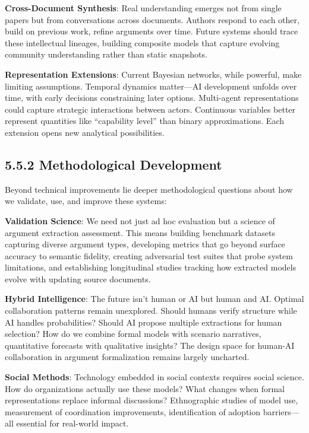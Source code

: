 \documentclass[
  11pt,
  letterpaper,
]{book}
\begin{document}
\textbf{Cross-Document Synthesis}: Real understanding emerges not from
single papers but from conversations across documents. Authors respond
to each other, build on previous work, refine arguments over time.
Future systems should trace these intellectual lineages, building
composite models that capture evolving community understanding rather
than static snapshots.

\textbf{Representation Extensions}: Current Bayesian networks, while
powerful, make limiting assumptions. Temporal dynamics matter---AI
development unfolds over time, with early decisions constraining later
options. Multi-agent representations could capture strategic
interactions between actors. Continuous variables better represent
quantities like ``capability level'' than binary approximations. Each
extension opens new analytical possibilities.

\subsection{5.5.2 Methodological
Development}\label{sec-methodological-development}

Beyond technical improvements lie deeper methodological questions about
how we validate, use, and improve these systems:

\textbf{Validation Science}: We need not just ad hoc evaluation but a
science of argument extraction assessment. This means building benchmark
datasets capturing diverse argument types, developing metrics that go
beyond surface accuracy to semantic fidelity, creating adversarial test
suites that probe system limitations, and establishing longitudinal
studies tracking how extracted models evolve with updating source
documents.

\textbf{Hybrid Intelligence}: The future isn't human or AI but human and
AI. Optimal collaboration patterns remain unexplored. Should humans
verify structure while AI handles probabilities? Should AI propose
multiple extractions for human selection? How do we combine formal
models with scenario narratives, quantitative forecasts with qualitative
insights? The design space for human-AI collaboration in argument
formalization remains largely uncharted.

\textbf{Social Methods}: Technology embedded in social contexts requires
social science. How do organizations actually use these models? What
changes when formal representations replace informal discussions?
Ethnographic studies of model use, measurement of coordination
improvements, identification of adoption barriers---all essential for
real-world impact.
\end{document}
